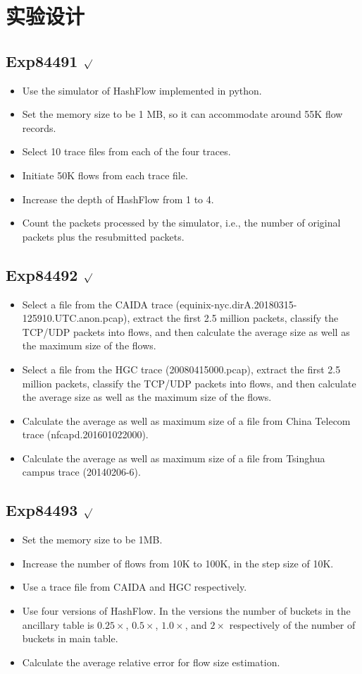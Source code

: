 \documentclass{article}
\begin{document}
\section{实验设计}
\subsection{Exp84491 $\surd$}
\begin{itemize}
	\item Use the simulator of HashFlow implemented in python.
	\item Set the memory size to be 1 MB, so it can accommodate around 55K flow records.
	\item Select 10 trace files from each of the four traces.
	\item Initiate 50K flows from each trace file.
	\item Increase the depth of HashFlow from 1 to 4. 
	\item Count the packets processed by the simulator, i.e., the number of original packets plus the resubmitted packets.
\end{itemize}

\subsection{Exp84492 $\surd$}
\begin{itemize}
	\item Select a file from the CAIDA trace (equinix-nyc.dirA.20180315-125910.UTC.anon.pcap), extract the first 2.5 million packets, classify the TCP/UDP packets into flows, and then calculate the average size as well as the maximum size of the flows.
	\item Select a file from the HGC trace (20080415000.pcap), extract the first 2.5 million packets, classify the TCP/UDP packets into flows, and then calculate the average size as well as the maximum size of the flows.
	\item Calculate the average as well as maximum size of a file from China Telecom trace (nfcapd.201601022000).
	\item Calculate the average as well as maximum size of a file from Tsinghua campus trace (20140206-6). 
\end{itemize}

\subsection{Exp84493 $\surd$}
\begin{itemize}
	\item Set the memory size to be 1MB. 
	\item Increase the number of flows from 10K to 100K, in the step size of 10K.
	\item Use a trace file from CAIDA and HGC respectively.
	\item Use four versions of HashFlow. In the versions the number of buckets in the ancillary table is $0.25\times$, $0.5\times$, $1.0\times$, and $2\times$ respectively of the number of buckets in main table.
	\item Calculate the average relative error for flow size estimation.
\end{itemize}
\end{document}
